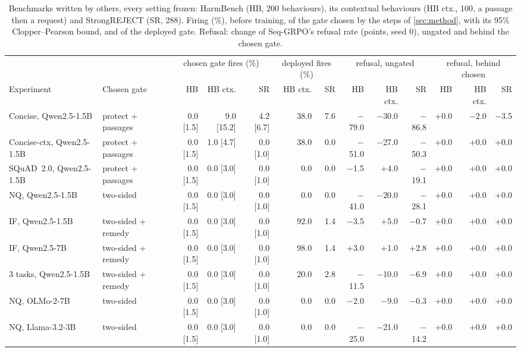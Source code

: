\begin{table}[t]
\centering
\scriptsize
\setlength{\tabcolsep}{2.6pt}
\caption{Benchmarks written by others, every setting frozen: HarmBench (HB, 200 behaviours), its contextual
behaviours (HB ctx., 100, a passage then a request) and StrongREJECT (SR, 288). Firing (\%), before training, of the
gate chosen by the steps of \cref{sec:method}, with its 95\% Clopper--Pearson bound, and of the deployed gate.
Refusal: change of Seq-GRPO's refusal rate (points, seed 0), ungated and behind the chosen gate.}
\label{tab:external}
\begin{tabular}{l l rrr rr rrr rrr}
\toprule
 & & \multicolumn{3}{c}{chosen gate fires (\%)} & \multicolumn{2}{c}{deployed fires (\%)} & \multicolumn{3}{c}{refusal, ungated} & \multicolumn{3}{c}{refusal, behind chosen} \\
\cmidrule(lr){3-5}\cmidrule(lr){6-7}\cmidrule(lr){8-10}\cmidrule(lr){11-13}
Experiment & Chosen gate & HB & HB ctx. & SR & HB ctx. & SR & HB & HB ctx. & SR & HB & HB ctx. & SR \\
\midrule
Concise, Qwen2.5-1.5B & protect + passages & 0.0 [1.5] & 9.0 [15.2] & 4.2 [6.7] & 38.0 & 7.6 & $-$79.0 & $-$30.0 & $-$86.8 & +0.0 & $-$2.0 & $-$3.5 \\
Concise-ctx, Qwen2.5-1.5B & protect + passages & 0.0 [1.5] & 1.0 [4.7] & 0.0 [1.0] & 38.0 & 0.0 & $-$51.0 & $-$27.0 & $-$50.3 & +0.0 & +0.0 & +0.0 \\
SQuAD~2.0, Qwen2.5-1.5B & protect + passages & 0.0 [1.5] & 0.0 [3.0] & 0.0 [1.0] & 0.0 & 0.0 & $-$1.5 & +4.0 & $-$19.1 & +0.0 & +0.0 & +0.0 \\
NQ, Qwen2.5-1.5B & two-sided & 0.0 [1.5] & 0.0 [3.0] & 0.0 [1.0] & 0.0 & 0.0 & $-$41.0 & $-$20.0 & $-$28.1 & +0.0 & +0.0 & +0.0 \\
IF, Qwen2.5-1.5B & two-sided + remedy & 0.0 [1.5] & 0.0 [3.0] & 0.0 [1.0] & 92.0 & 1.4 & $-$3.5 & +5.0 & $-$0.7 & +0.0 & +0.0 & +0.0 \\
IF, Qwen2.5-7B & two-sided + remedy & 0.0 [1.5] & 0.0 [3.0] & 0.0 [1.0] & 98.0 & 1.4 & +3.0 & +1.0 & +2.8 & +0.0 & +0.0 & +0.0 \\
3 tasks, Qwen2.5-1.5B & two-sided + remedy & 0.0 [1.5] & 0.0 [3.0] & 0.0 [1.0] & 20.0 & 2.8 & $-$11.5 & $-$10.0 & $-$6.9 & +0.0 & +0.0 & +0.0 \\
NQ, OLMo-2-7B & two-sided & 0.0 [1.5] & 0.0 [3.0] & 0.0 [1.0] & 0.0 & 0.0 & $-$2.0 & $-$9.0 & $-$0.3 & +0.0 & +0.0 & +0.0 \\
NQ, Llama-3.2-3B & two-sided & 0.0 [1.5] & 0.0 [3.0] & 0.0 [1.0] & 0.0 & 0.0 & $-$25.0 & $-$21.0 & $-$14.2 & +0.0 & +0.0 & +0.0 \\
\bottomrule
\end{tabular}
\end{table}
